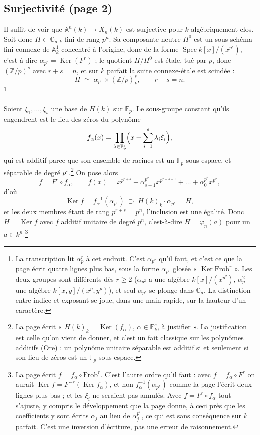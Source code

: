 \documentclass[11pt,a4paper]{article}
\begin{document}
\subsection*{Surjectivité (page 2)}

Il suffit de voir que $\mathbb{A}^n(k) \to X_n(k)$ est surjective pour $k$
algébriquement clos. Soit donc $H \subset \mathbb{G}_{a,k}$ fini de rang
$p^n$. Sa composante neutre $H^0$ est un sous-schéma fini connexe de
$\mathbb{A}^1_k$ concentré à l'origine, donc de la forme
$\operatorname{Spec} k[x]/(x^{p^r})$, c'est-à-dire
$\alpha_{p^r} = \operatorname{Ker}(F^r)$ ; le quotient $H/H^0$ est étale, tué
par $p$, donc $(\mathbb{Z}/p)^s$ avec $r + s = n$, et sur $k$ parfait la
suite connexe-étale est scindée :
\[
  H \;\simeq\; \alpha_{p^r} \times (\mathbb{Z}/p)^s_k , \qquad r + s = n .
\]
\footnote{La transcription lit $\alpha_p^r$ à cet endroit. C'est
$\alpha_{p^r}$ qu'il faut, et c'est ce que la page écrit quatre lignes plus
bas, sous la forme $\alpha_{p^r}$ glosée
« $\operatorname{Ker} \mathrm{Frob}^r$ ». Les deux groupes sont différents
dès $r \geqslant 2$ ($\alpha_{p^2}$ a une algèbre $k[x]/(x^{p^2})$, $\alpha_p^2$
une algèbre $k[x,y]/(x^p, y^p)$), et seul $\alpha_{p^r}$ se plonge dans
$\mathbb{G}_a$. La distinction entre indice et exposant se joue, dans une
main rapide, sur la hauteur d'un caractère.}

Soient $\xi_1, \dots, \xi_s$ une base de $H(k)$ sur $\mathbb{F}_p$. Le
sous-groupe constant qu'ils engendrent est le lieu des zéros du polynôme
\[
  f_\alpha(x) = \prod_{\lambda \in \mathbb{F}_p^s}
  \Bigl(x - \sum_{i=1}^{s} \lambda_i \xi_i\Bigr),
\]
qui est additif parce que son ensemble de racines est un
$\mathbb{F}_p$-sous-espace, et séparable de degré
$p^s$.\footnote{La page écrit « $H(k)_k = \operatorname{Ker}(f_\alpha)$,
$\alpha \in \mathbb{E}^s_k$, à justifier ». La justification est celle qu'on
vient de donner, et c'est un fait classique sur les polynômes additifs
(Ore) : un polynôme unitaire séparable est additif si et seulement si son
lieu de zéros est un $\mathbb{F}_p$-sous-espace.} On pose alors
\[
  f = F^r \circ f_\alpha , \qquad
  f(x) = x^{p^{r+s}} + \alpha_{s-1}^{p^r} x^{p^{r+s-1}} + \dots
  + \alpha_0^{p^r} x^{p^r} ,
\]
d'où
\[
  \operatorname{Ker} f = f_\alpha^{-1}(\alpha_{p^r}) \;\supset\;
  H(k)_k \cdot \alpha_{p^r} = H ,
\]
et les deux membres étant de rang $p^{r+s} = p^n$, l'inclusion est une
égalité. Donc $H = \operatorname{Ker} f$ avec $f$ additif unitaire de degré
$p^n$, c'est-à-dire $H = \varphi_n(a)$ pour un $a \in
k^n$.\footnote{La page écrit $f = f_\alpha \circ \mathrm{Frob}^r$. C'est
l'autre ordre qu'il faut : avec $f = f_\alpha \circ F^r$ on aurait
$\operatorname{Ker} f = F^{-r}(\operatorname{Ker} f_\alpha)$, et non
$f_\alpha^{-1}(\alpha_{p^r})$ comme la page l'écrit deux lignes plus bas ; et
les $\xi_i$ ne seraient pas annulés. Avec $f = F^r \circ f_\alpha$ tout
s'ajuste, y compris le développement que la page donne, à ceci près que les
coefficients y sont écrits $\alpha_j$ au lieu de $\alpha_j^{p^r}$, ce qui est
sans conséquence sur $k$ parfait. C'est une inversion d'écriture, pas une
erreur de raisonnement.}
\end{document}
